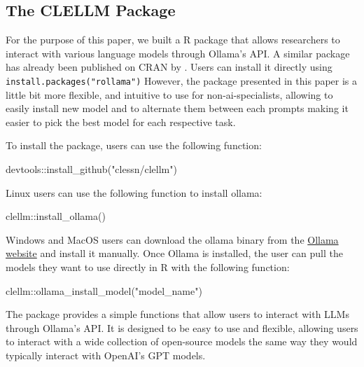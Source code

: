 \documentclass[
  authoryear,
  preprint,
  3p]{elsarticle}
\newenvironment{Shaded}{\begin{snugshade}}{\end{snugshade}}
\newcommand{\FunctionTok}[1]{\textcolor[rgb]{0.28,0.35,0.67}{#1}}
\newcommand{\NormalTok}[1]{\textcolor[rgb]{0.00,0.23,0.31}{#1}}
\newcommand{\SpecialCharTok}[1]{\textcolor[rgb]{0.37,0.37,0.37}{#1}}
\newcommand{\StringTok}[1]{\textcolor[rgb]{0.13,0.47,0.30}{#1}}
\begin{document}
\subsection{The CLELLM Package}\label{the-clellm-package}

For the purpose of this paper, we built a R package that allows
researchers to interact with various language models through Ollama's
API. A similar package has already been published on CRAN by
\citet{gruber_weber24}. Users can install it directly using
\texttt{install.packages("rollama")} However, the package presented in
this paper is a little bit more flexible, and intuitive to use for
non-ai-specialists, allowing to easily install new model and to
alternate them between each prompts making it easier to pick the best
model for each respective task.

To install the package, users can use the following function:

\begin{Shaded}
\begin{Highlighting}[]
\NormalTok{devtools}\SpecialCharTok{::}\FunctionTok{install\_github}\NormalTok{(}\StringTok{"clessn/clellm"}\NormalTok{)}
\end{Highlighting}
\end{Shaded}

Linux users can use the following function to install ollama:

\begin{Shaded}
\begin{Highlighting}[]
\NormalTok{clellm}\SpecialCharTok{::}\FunctionTok{install\_ollama}\NormalTok{()}
\end{Highlighting}
\end{Shaded}

Windows and MacOS users can download the ollama binary from the
\href{https://ollama.com/}{Ollama website} and install it manually. Once
Ollama is installed, the user can pull the models they want to use
directly in R with the following function:

\begin{Shaded}
\begin{Highlighting}[]
\NormalTok{clellm}\SpecialCharTok{::}\FunctionTok{ollama\_install\_model}\NormalTok{(}\StringTok{"model\_name"}\NormalTok{)}
\end{Highlighting}
\end{Shaded}

The package provides a simple functions that allow users to interact
with LLMs through Ollama's API. It is designed to be easy to use and
flexible, allowing users to interact with a wide collection of
open-source models the same way they would typically interact with
OpenAI's GPT models.
\end{document}
